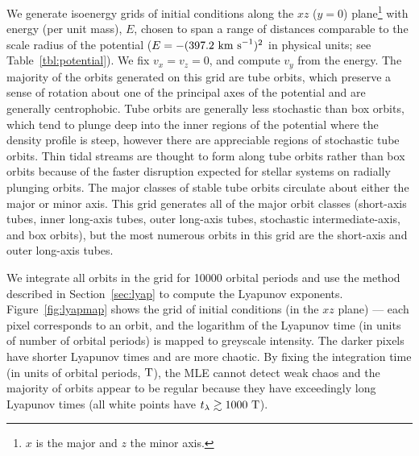 \documentclass[letterpaper,12pt,preprint]{aastex}
\newcommand{\periods}{\ensuremath{{\rm T}}}
\begin{document}
We generate isoenergy grids of initial conditions along the $xz$ ($y=0$) plane\footnote{$x$ is the major and $z$ the minor axis.} with energy (per unit mass), $E$, chosen to span a range of distances comparable to the scale radius of the potential ($E=-(397.2~{\rm km~s}^{-1})^2$ in physical units; see Table~\ref{tbl:potential}). We fix $v_x = v_z = 0$, and compute $v_y$ from the energy. The majority of the orbits generated on this grid are tube orbits, which preserve a sense of rotation about one of the principal axes of the potential and are generally centrophobic. Tube orbits are generally less stochastic than box orbits, which tend to plunge deep into the inner regions of the potential where the density profile is steep, however there are appreciable regions of stochastic tube orbits. Thin tidal streams are thought to form along tube orbits rather than box orbits because of the faster disruption expected for stellar systems on radially plunging orbits. The major classes of stable tube orbits circulate about either the major or minor axis. This grid generates all of the major orbit classes (short-axis tubes, inner long-axis tubes, outer long-axis tubes, stochastic intermediate-axis, and box orbits), but the most numerous orbits in this grid are the short-axis and outer long-axis tubes. 

We integrate all orbits in the grid for 10000 orbital periods and use the method described in Section~\ref{sec:lyap} to compute the Lyapunov exponents. Figure~\ref{fig:lyapmap} shows the grid of initial conditions (in the $xz$ plane) --- each pixel corresponds to an orbit, and the logarithm of the Lyapunov time (in units of number of orbital periods) is mapped to greyscale intensity. The darker pixels have shorter Lyapunov times and are more chaotic. By fixing the integration time (in units of orbital periods, $\periods$), the MLE cannot detect weak chaos and the majority of orbits appear to be regular because they have exceedingly long Lyapunov times (all white points have $t_\lambda \gtrsim 1000~\periods$). 
\end{document}
